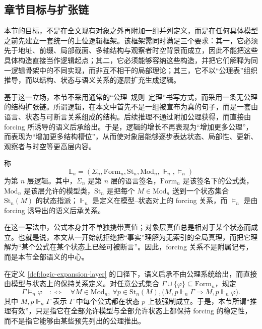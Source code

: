 \subsection{章节目标与扩张链}\label{subsec:logic-expansion-chain-goal}

本节的目标，不是在全文现有对象之外再附加一组并列定义，而是在任何具体模型之前先建立一套统一的上位逻辑框架。该框架需同时满足三个要求：其一，它必须先于地址、前缀、局部截面、多轴结构与观察者时空背景而成立，因此不能把这些具体构造直接当作逻辑起点；其二，它必须能够容纳这些构造，并把它们解释为同一逻辑骨架中的不同实现，而非互不相干的局部理论；其三，它不以“公理表”组织推导，而以结构、状态与语义关系的逐层扩充生成逻辑。

基于这一立场，本节不采用通常的“公理--规则--定理”书写方式，而采用一条无公理的结构扩张链。所谓逻辑，在本文中首先不是一组被宣布为真的句子，而是一套由语言、状态与可断言关系组成的结构。后续推理不通过附加公理获得，而直接由 forcing 所诱导的语义后承给出。于是，逻辑的增长不再表现为“增加更多公理”，而表现为“增加更多结构槽位”，从而使对象层能够逐步表达状态、局部性、更新、观察者与时空等更高层内容。

\begin{definition}[逻辑层]\label{def:logic-expansion-layer}
称
\[
\mathbb{L}_n=(\Sigma_n,\mathrm{Form}_n,\mathrm{St}_n,\mathrm{Mod}_n,\Vdash_n,\models_n)
\]
为第 \(n\) 层逻辑。其中，\(\Sigma_n\) 是第 \(n\) 层的语言签名，\(\mathrm{Form}_n\) 是该签名下的公式类，\(\mathrm{Mod}_n\) 是该层允许的模型类，\(\mathrm{St}_n\) 是把每个 \(M\in\mathrm{Mod}_n\) 送到一个状态集合 \(\mathrm{St}_n(M)\) 的状态指派；\(\Vdash_n\) 是定义在模型--状态对上的 forcing 关系，而 \(\models_n\) 是由 forcing 诱导出的语义后承关系。
\end{definition}

在这一写法中，公式本身并不单独携带真值；对象层真值总是相对于某个状态而成立。也就是说，本文从一开始就拒绝把“事实”理解为无索引的全局真理，而把它理解为“某个公式在某个状态上已经可被断言”。因此，forcing 关系不是附属记号，而是本节全部语义的中心。

在定义 \ref{def:logic-expansion-layer} 的口径下，语义后承不由公理系统给出，而直接由模型与状态上的保持关系定义。对任意公式集合 \(\Gamma\cup\{\varphi\}\subseteq \mathrm{Form}_n\)，规定
\[
\Gamma \models_n \varphi
\quad:\Longleftrightarrow\quad
\forall M\in\mathrm{Mod}_n,\ \forall p\in \mathrm{St}_n(M),
\bigl(M,p\Vdash_n \Gamma \Rightarrow M,p\Vdash_n \varphi\bigr).
\]
其中 \(M,p\Vdash_n \Gamma\) 表示 \(\Gamma\) 中每个公式都在状态 \(p\) 上被强制成立。于是，本节所谓“推理有效”，只是指它在全部允许模型与全部允许状态上都保持 forcing 的稳定性，而不是指它能够由某些预先列出的公理推出。

